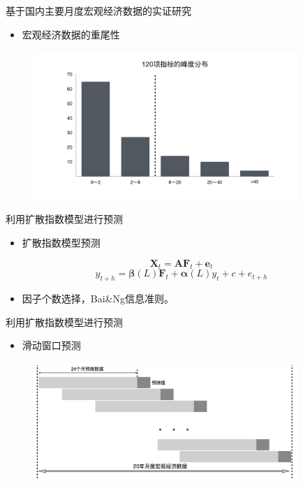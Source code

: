 \begin{frame}{基于国内主要月度宏观经济数据的实证研究}
    \begin{itemize}
        \item
        宏观经济数据的重尾性
    \end{itemize}
    \begin{figure}[H]
        \includegraphics[width=10cm]{pics/skew.pdf}
    \end{figure}
\end{frame}

\begin{frame}{利用扩散指数模型进行预测}
    \begin{itemize}
        \item
        扩散指数模型预测
    \end{itemize}
\begin{equation}
    \bm{X}_t = \bm{A}\bm{F}_t + \bm{e}_t
\end{equation}
\begin{equation}\label{predict-factor-model}
    y_{t+h} = \bm{\beta}(L)\bm{F}_t + \bm{\alpha}(L)y_t + c + e_{t+h}
\end{equation}
\begin{itemize}
    \item
    因子个数选择，Bai\&Ng信息准则。
\end{itemize}
\end{frame}

\begin{frame}{利用扩散指数模型进行预测}
    \begin{itemize}
        \item
        滑动窗口预测
    \end{itemize}
    \begin{figure}[H]
        \includegraphics[width=10cm]{pics/predict.png}
    \end{figure}
\end{frame}


